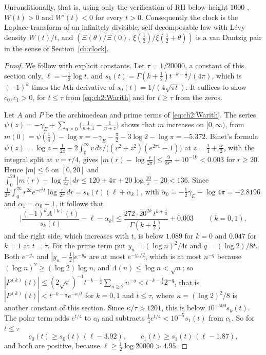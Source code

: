 \begin{theorem}[{\cite[Theorem A]{P26}}]\label{thm:ch12:idsd}
Unconditionally, that is, using only the verification of RH below height $1000$ \cite{PT21}, $W(t)>0$ and $W'(t)<0$ for every $t>0$. Consequently the clock is the Laplace transform of an infinitely divisible, self decomposable law with L\'evy density $W(t)/t$, and $(\Xi(\theta)/\Xi(0),\ \xi(\frac12)/\xi(\frac12+\theta))$ is a van Dantzig pair in the sense of Section~\ref{ch:clock}.
\end{theorem}

\begin{proof}
We follow \cite[Theorem A]{P26} with explicit constants. Let $\tau=1/20000$, a constant of this section only, $\ell=-\frac12\log t$, and $s_k(t)=\Gamma(k+\frac12)t^{-k-\frac12}/(4\pi)$, which is $(-1)^k$ times the $k$th derivative of $s_0(t)=1/(4\sqrt{\pi t})$. It suffices to show $c_0,c_1>0$, for $t\le\tau$ from \eqref{eq:ch2:Warith} and for $t\ge\tau$ from the zeros.

Let $A$ and $P$ be the archimedean and prime terms of \eqref{eq:ch2:Warith}. The series $\psi(z)=-\gamma_E+\sum_{n\ge0}\big(\frac1{n+1}-\frac1{n+z}\big)$ \cite[(5.7.6)]{DLMF} shows that $m$ increases on $[0,\infty)$, from $m(0)=\psi(\frac14)-\log\pi=-\gamma_E-\frac\pi2-3\log2-\log\pi=-5.372$. Binet's formula $\psi(z)=\log z-\frac1{2z}-2\int_0^\infty v\,dv/\big((v^2+z^2)(e^{2\pi v}-1)\big)$ \cite[(5.9.15)]{DLMF} at $z=\frac14+\frac{ir}2$, with the integral split at $v=r/4$, gives $|m(r)-\log\frac r{2\pi}|\le\frac9{8r^2}+10^{-10}<0.003$ for $r\ge20$. Hence $|m|\le6$ on $[0,20]$ and $\int_0^{20}|m(r)-\log\frac r{2\pi}|\,dr\le120+4\pi+20\log\frac{10}\pi-20<136$. Since $\frac1{2\pi}\int_0^\infty r^{2k}e^{-r^2t}\log\frac r{2\pi}\,dr=s_k(t)(\ell+\alpha_k)$, with $\alpha_0=-\frac12\gamma_E-\log4\pi=-2.8196$ and $\alpha_1=\alpha_0+1$, it follows that
\[
\Big|\frac{(-1)^kA^{(k)}(t)}{s_k(t)}-\ell-\alpha_k\Big|\le\frac{272\cdot20^{2k}\,t^{k+\frac12}}{\Gamma(k+\frac12)}+0.003\qquad(k=0,1),
\]
and the right side, which increases with $t$, is below $1.089$ for $k=0$ and $0.047$ for $k=1$ at $t=\tau$. For the prime term put $y_n=(\log n)^2/4t$ and $q=(\log2)/8t$. Both $e^{-y_n}$ and $|y_n-\frac12|e^{-y_n}$ are at most $e^{-y_n/2}$, which is at most $n^{-q}$ because $(\log n)^2\ge(\log2)\log n$, and $\Lambda(n)\le\log n<\sqrt n$; so $|P^{(k)}(t)|\le(2\sqrt\pi)^{-1}t^{-k-\frac12}\sum_{n\ge2}n^{-q}<t^{-k-\frac12}2^{-q}$, that is $|P^{(k)}(t)|<t^{-k-\frac12}e^{-\kappa/t}$ for $k=0,1$ and $t\le\tau$, where $\kappa=(\log2)^2/8$ is another constant of this section. Since $\kappa/\tau>1201$, this is below $10^{-500}s_k(t)$. The polar term adds $e^{t/4}$ to $c_0$ and subtracts $\frac14e^{t/4}<10^{-5}s_1(t)$ from $c_1$. So for $t\le\tau$
\[
c_0(t)\ge s_0(t)\,(\ell-3.92),\qquad c_1(t)\ge s_1(t)\,(\ell-1.87),
\]
and both are positive, because $\ell\ge\frac12\log20000>4.95$.


\end{proof}
